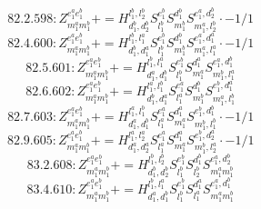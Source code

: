 \documentclass[letterpaper,10pt,fleqn,leqno,onecolumn]{article}
\begin{document}
\begin{equation} \;\;\;\;\;\;  82.2.598: Z^{e_{1}^{a}e_{1}^{b}}_{m_{1}^{a}m_{1}^{b}}+=H^{l_{1}^{b},l_{2}^{b}}_{d_{1}^{b},d_{2}^{b}}S^{e_{1}^{b}}_{l_{1}^{b}}S^{d_{1}^{b}}_{m_{1}^{b}}S^{e_{1}^{a},d_{2}^{b}}_{m_{1}^{a},l_{2}^{b}}\cdot -1/1 \end{equation}
\begin{equation} \;\;\;\;\;\;  82.4.600: Z^{e_{1}^{a}e_{1}^{b}}_{m_{1}^{a}m_{1}^{b}}+=H^{l_{1}^{b},l_{1}^{a}}_{d_{1}^{b},d_{1}^{a}}S^{e_{1}^{b}}_{l_{1}^{b}}S^{d_{1}^{b}}_{m_{1}^{b}}S^{e_{1}^{a},d_{1}^{a}}_{m_{1}^{a},l_{1}^{a}}\cdot -1/1 \end{equation}
\begin{equation} \;\;\;\;\;\;  82.5.601: Z^{e_{1}^{a}e_{1}^{b}}_{m_{1}^{a}m_{1}^{b}}+=H^{l_{1}^{b},l_{1}^{a}}_{d_{1}^{a},d_{1}^{b}}S^{e_{1}^{b}}_{l_{1}^{b}}S^{d_{1}^{a}}_{m_{1}^{a}}S^{e_{1}^{a},d_{1}^{b}}_{m_{1}^{b},l_{1}^{a}} \end{equation}
\begin{equation} \;\;\;\;\;\;  82.6.602: Z^{e_{1}^{a}e_{1}^{b}}_{m_{1}^{a}m_{1}^{b}}+=H^{l_{1}^{a},l_{1}^{b}}_{d_{1}^{b},d_{1}^{a}}S^{e_{1}^{a}}_{l_{1}^{a}}S^{d_{1}^{b}}_{m_{1}^{b}}S^{e_{1}^{b},d_{1}^{a}}_{m_{1}^{a},l_{1}^{b}} \end{equation}
\begin{equation} \;\;\;\;\;\;  82.7.603: Z^{e_{1}^{a}e_{1}^{b}}_{m_{1}^{a}m_{1}^{b}}+=H^{l_{1}^{a},l_{1}^{b}}_{d_{1}^{a},d_{1}^{b}}S^{e_{1}^{a}}_{l_{1}^{a}}S^{d_{1}^{a}}_{m_{1}^{a}}S^{e_{1}^{b},d_{1}^{b}}_{m_{1}^{b},l_{1}^{b}}\cdot -1/1 \end{equation}
\begin{equation} \;\;\;\;\;\;  82.9.605: Z^{e_{1}^{a}e_{1}^{b}}_{m_{1}^{a}m_{1}^{b}}+=H^{l_{1}^{a},l_{2}^{a}}_{d_{1}^{a},d_{2}^{a}}S^{e_{1}^{a}}_{l_{1}^{a}}S^{d_{1}^{a}}_{m_{1}^{a}}S^{e_{1}^{b},d_{2}^{a}}_{m_{1}^{b},l_{2}^{a}}\cdot -1/1 \end{equation}
\begin{equation} \;\;\;\;\;\;  83.2.608: Z^{e_{1}^{a}e_{1}^{b}}_{m_{1}^{a}m_{1}^{b}}+=H^{l_{1}^{b},l_{2}^{b}}_{d_{1}^{b},d_{2}^{b}}S^{e_{1}^{b}}_{l_{1}^{b}}S^{d_{1}^{b}}_{l_{2}^{b}}S^{e_{1}^{a},d_{2}^{b}}_{m_{1}^{a}m_{1}^{b}} \end{equation}
\begin{equation} \;\;\;\;\;\;  83.4.610: Z^{e_{1}^{a}e_{1}^{b}}_{m_{1}^{a}m_{1}^{b}}+=H^{l_{1}^{b},l_{1}^{a}}_{d_{1}^{a},d_{1}^{b}}S^{e_{1}^{b}}_{l_{1}^{b}}S^{d_{1}^{a}}_{l_{1}^{a}}S^{e_{1}^{a},d_{1}^{b}}_{m_{1}^{a}m_{1}^{b}} \end{equation}
\end{document}
